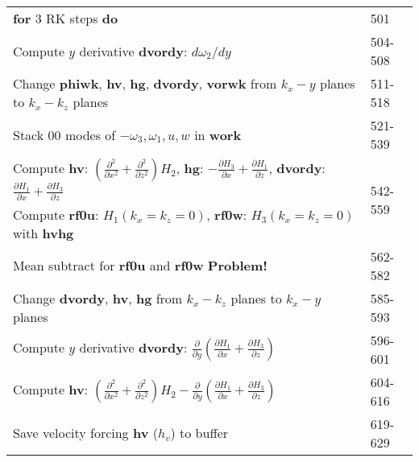 \documentclass[titlepage,12pt,letter]{article}
\newcommand{\p}{\partial}
\newcommand{\paren}[1]{\left( #1 \right)}
\newcommand{\red}[1]{{{\color{red}\textbf{#1}}}}
\numberwithin{equation}{section}
\begin{document}
\begin{table}[H]
\begin{tabular}{l|l}
		\qquad \textbf{for} 3 RK steps \textbf{do}& 501\\
		\qquad \qquad Compute $y$ derivative \textbf{dvordy}: $d \omega_2 /dy$&504-508\\
		\qquad \qquad Change \textbf{phiwk}, \textbf{hv}, \textbf{hg}, \textbf{dvordy}, \textbf{vorwk} from $k_x-y$ planes to $k_x-k_z$ planes&511-518\\
		\qquad \qquad Stack 00 modes of $-\omega_3,\omega_1,u,w$ in \textbf{work}&521-539\\
		\qquad \qquad Compute \textbf{hv}: $\paren{\tfrac{\p^2}{\p x^2}+\tfrac{\p^2}{\p z^2}}H_2$, \textbf{hg}: $-\tfrac{\p H_3}{\p x} + \tfrac{\p H_1}{\p z}$, \textbf{dvordy}: $\tfrac{\p H_1}{\p x} + \tfrac{\p H_3}{\p z}$&\multirow{2}{*}{542-559}\\
		\qquad \qquad Compute \textbf{rf0u}: $H_1(k_x=k_z=0)$, \textbf{rf0w}: $H_3(k_x=k_z=0)$ with \textbf{hvhg}&\\
		\qquad \qquad Mean subtract for \textbf{rf0u} and \textbf{rf0w} \red{Problem!}&562-582\\
		\qquad \qquad Change \textbf{dvordy}, \textbf{hv}, \textbf{hg} from $k_x-k_z$ planes to $k_x-y$ planes&585-593\\
		\qquad \qquad Compute $y$ derivative \textbf{dvordy}:  $\frac{\p}{\p y} \paren{\tfrac{\p H_1}{\p x} + \tfrac{\p H_3}{\p z}}$&596-601\\
		\qquad \qquad Compute \textbf{hv}:  $\paren{\tfrac{\p^2}{\p x^2}+\tfrac{\p^2}{\p z^2}}H_2-\frac{\p}{\p y} \paren{\tfrac{\p H_1}{\p x} + \tfrac{\p H_3}{\p z}}$&604-616\\
		\qquad \qquad Save velocity forcing \textbf{hv} ($h_v$) to buffer&619-629
		\end{tabular} 
\end{table}
\newpage
\end{document}
